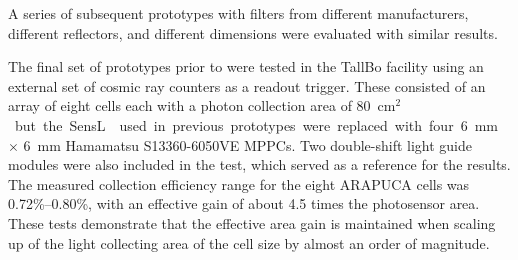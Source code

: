 
 


A series of subsequent prototypes with filters from different manufacturers, different reflectors, and different dimensions were evaluated with similar results. 

The final set of prototypes prior to  were tested in the TallBo facility using an external set of cosmic ray counters as a readout trigger. These consisted of an array of eight  cells each with a photon collection area of \SI{80}{cm$^2$} but the SensL  used in previous prototypes were replaced with four \SI{6}{mm} $\times$ \SI{6}{mm} Hamamatsu S13360-6050VE MPPCs. 
Two double-shift light guide modules were also included in the test, which served as a reference for the  results.
The measured collection efficiency range for the eight ARAPUCA cells was 0.72\%--0.80\%, with an effective  gain of about 4.5 times the photosensor area. These tests demonstrate that the effective area gain is maintained when scaling up of the light collecting area of the cell size by almost an order of magnitude.

